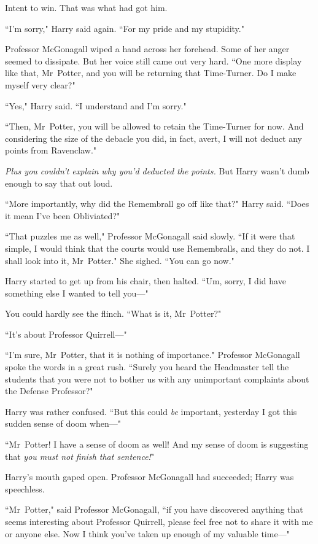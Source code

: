 Intent to win. That was what had got him.

``I'm sorry," Harry said again. ``For my pride and my stupidity."

Professor McGonagall wiped a hand across her forehead. Some of her anger seemed to dissipate. But her voice still came out very hard. ``One more display like that, Mr~Potter, and you will be returning that Time-Turner. Do I make myself very clear?"

``Yes," Harry said. ``I understand and I'm sorry."

``Then, Mr~Potter, you will be allowed to retain the Time-Turner for now. And considering the size of the debacle you did, in fact, avert, I will not deduct any points from Ravenclaw."

\emph{Plus you couldn't explain why you'd deducted the points.} But Harry wasn't dumb enough to say that out loud.

``More importantly, why did the Remembrall go off like that?" Harry said. ``Does it mean I've been Obliviated?"

``That puzzles me as well," Professor McGonagall said slowly. ``If it were that simple, I would think that the courts would use Remembralls, and they do not. I shall look into it, Mr~Potter." She sighed. ``You can go now."

Harry started to get up from his chair, then halted. ``Um, sorry, I did have something else I wanted to tell you—"

You could hardly see the flinch. ``What is it, Mr~Potter?"

``It's about Professor Quirrell—"

``I'm sure, Mr~Potter, that it is nothing of importance." Professor McGonagall spoke the words in a great rush. ``Surely you heard the Headmaster tell the students that you were not to bother us with any unimportant complaints about the Defense Professor?"

Harry was rather confused. ``But this could \emph{be} important, yesterday I got this sudden sense of doom when—"

``Mr~Potter! I have a sense of doom as well! And my sense of doom is suggesting that \emph{you must not finish that sentence!}"

Harry's mouth gaped open. Professor McGonagall had succeeded; Harry was speechless.

``Mr~Potter," said Professor McGonagall, ``if you have discovered anything that seems interesting about Professor Quirrell, please feel free not to share it with me or anyone else. Now I think you've taken up enough of my valuable time—"

